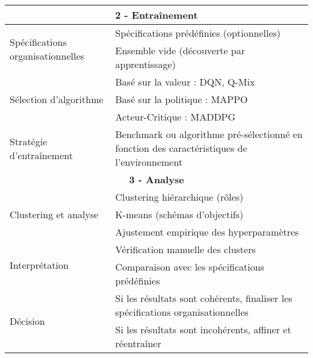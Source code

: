 \begin{table}[h!]
\begin{tabular}{|l|p{10cm}|}
        \multicolumn{2}{|c|}{\textbf{2 - Entraînement}}                                                                                       \\ \hline
        \multirow{2}{*}{Spécifications organisationnelles}
                                                & Spécifications prédéfinies (optionnelles)                                                   \\
                                                & Ensemble vide (découverte par apprentissage)                                                \\ \hline
        \multirow{3}{*}{Sélection d’algorithme}
                                                & Basé sur la valeur : DQN, Q-Mix                                                             \\
                                                & Basé sur la politique : MAPPO                                                               \\
                                                & Acteur-Critique : MADDPG                                                                    \\ \hline
        Stratégie d’entraînement                & Benchmark ou algorithme pré-sélectionné en fonction des caractéristiques de l’environnement \\ \hline

        \multicolumn{2}{|c|}{\textbf{3 - Analyse}}                                                                                            \\ \hline
        \multirow{3}{*}{Clustering et analyse}
                                                & Clustering hiérarchique (rôles)                                                             \\
                                                & K-means (schémas d’objectifs)                                                               \\
                                                & Ajustement empirique des hyperparamètres                                                    \\ \hline
        \multirow{2}{*}{Interprétation}
                                                & Vérification manuelle des clusters                                                          \\
                                                & Comparaison avec les spécifications prédéfinies                                             \\ \hline
        \multirow{2}{*}{Décision}
                                                & Si les résultats sont cohérents, finaliser les spécifications organisationnelles            \\
                                                & Si les résultats sont incohérents, affiner et réentraîner                                   \\ \hline


\end{tabular}
\end{table}
